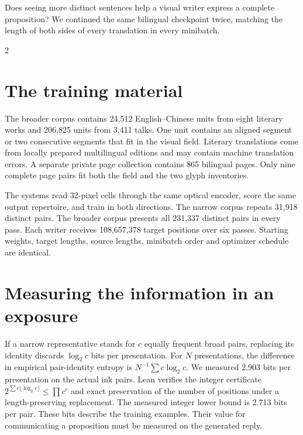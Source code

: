 \newpage
{}
\noindent Does seeing more distinct sentences help a visual writer express a complete proposition? We continued the same bilingual checkpoint twice, matching the length of both sides of every translation in every minibatch.
\begin{multicols}{2}
\section*{The training material}
The broader corpus contains 24,512 English--Chinese units from eight literary works and 206,825 units from 3,411 talks. One unit contains an aligned segment or two consecutive segments that fit in the visual field. Literary translations come from locally prepared multilingual editions and may contain machine translation errors. A separate private page collection contains 865 bilingual pages. Only nine complete page pairs fit both the field and the two glyph inventories.
\par The systems read 32-pixel cells through the same optical encoder, score the same output repertoire, and train in both directions. The narrow corpus repeats 31,918 distinct pairs. The broader corpus presents all 231,337 distinct pairs in every pass. Each writer receives 108,657,378 target positions over six passes. Starting weights, target lengths, source lengths, minibatch order and optimizer schedule are identical.
\section*{Measuring the information in an exposure}
If a narrow representative stands for $c$ equally frequent broad pairs, replacing its identity discards $\log_2 c$ bits per presentation. For $N$ presentations, the difference in empirical pair-identity entropy is $N^{-1}\sum c\log_2 c$. We measured 2.903 bits per presentation on the actual ink pairs. Lean verifies the integer certificate $2^{\sum c\lfloor\log_2 c\rfloor}\leq\prod c^c$ and exact preservation of the number of positions under a length-preserving replacement. The measured integer lower bound is 2.713 bits per pair. These bits describe the training examples. Their value for communicating a proposition must be measured on the generated reply.

\end{multicols}
